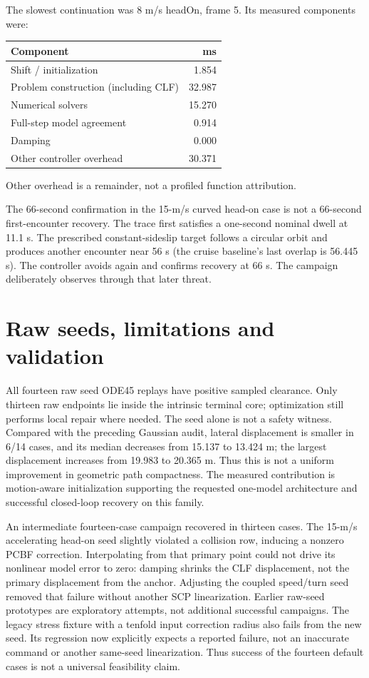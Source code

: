 \documentclass[10pt]{article}
\begin{document}
The slowest continuation was 8 m/s headOn, frame 5. Its measured components were:
\begin{center}\begin{tabular}{lr}\toprule Component & ms\\\midrule
Shift / initialization & 1.854\\
Problem construction (including CLF) & 32.987\\
Numerical solvers & 15.270\\
Full-step model agreement & 0.914\\
Damping & 0.000\\
Other controller overhead & 30.371\\
\bottomrule\end{tabular}\end{center}
Other overhead is a remainder, not a profiled function attribution.

The 66-second confirmation in the 15-m/s curved head-on case is not a
66-second first-encounter recovery. The trace first satisfies a one-second
nominal dwell at 11.1 s. The prescribed constant-sideslip target follows a
circular orbit and produces another encounter near 56 s (the cruise baseline's
last overlap is 56.445 s). The controller avoids again and confirms recovery
at 66 s. The campaign deliberately observes through that later threat.

\section{Raw seeds, limitations and validation}
All fourteen raw seed ODE45 replays have positive sampled clearance. Only
thirteen raw endpoints lie inside the intrinsic terminal core; optimization
still performs local repair where needed. The seed alone is not a safety
witness. Compared with the preceding Gaussian audit, lateral displacement is
smaller in 6/14 cases, and its median decreases from 15.137 to 13.424 m; the
largest displacement increases from 19.983 to 20.365 m. Thus this is not a
uniform improvement in geometric path compactness. The measured contribution
is motion-aware initialization supporting the requested one-model architecture
and successful closed-loop recovery on this family.

An intermediate fourteen-case campaign recovered in thirteen cases. The
15-m/s accelerating head-on seed slightly violated a collision row, inducing a
nonzero PCBF correction. Interpolating from that primary point could not drive
its nonlinear model error to zero: damping shrinks the CLF displacement, not
the primary displacement from the anchor. Adjusting the coupled speed/turn
seed removed that failure without another SCP linearization. Earlier raw-seed
prototypes are exploratory attempts, not additional successful campaigns. The
legacy stress fixture with a tenfold input correction radius also fails from
the new seed. Its regression now explicitly expects a reported failure, not
an inaccurate command or another same-seed linearization. Thus success of the
fourteen default cases is not a universal feasibility claim.
\end{document}
